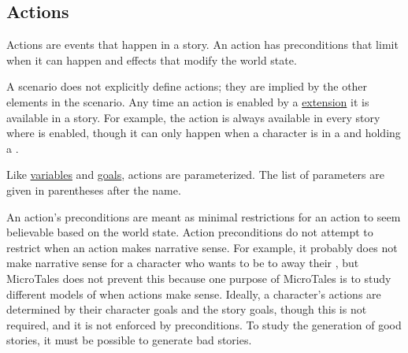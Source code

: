 \documentclass{nilreport}
\begin{document}


\newpage

\subsection{Actions} \label{sec:actions}

Actions are events that happen in a story. An action has preconditions that limit when it can happen and effects that modify the world state.

A scenario does not explicitly define actions; they are implied by the other elements in the scenario. Any time an action is enabled by a \hyperref[sec:extensions]{extension} it is available in a story. For example, the  action is always available in every story where  is enabled, though it can only happen when a character is in a  and holding a .

Like \hyperref[sec:variables]{variables} and \hyperref[sec:goals]{goals}, actions are parameterized. The list of parameters are given in parentheses after the name.

An action's preconditions are meant as minimal restrictions for an action to seem believable based on the world state. Action preconditions do not attempt to restrict when an action makes narrative sense. For example, it probably does not make narrative sense for a character who wants to be  to  away their , but MicroTales does not prevent this because one purpose of MicroTales is to study different models of when actions make sense. Ideally, a character's actions are determined by their character goals and the story goals, though this is not required, and it is not enforced by preconditions. To study the generation of good stories, it must be possible to generate bad stories.
\end{document}
